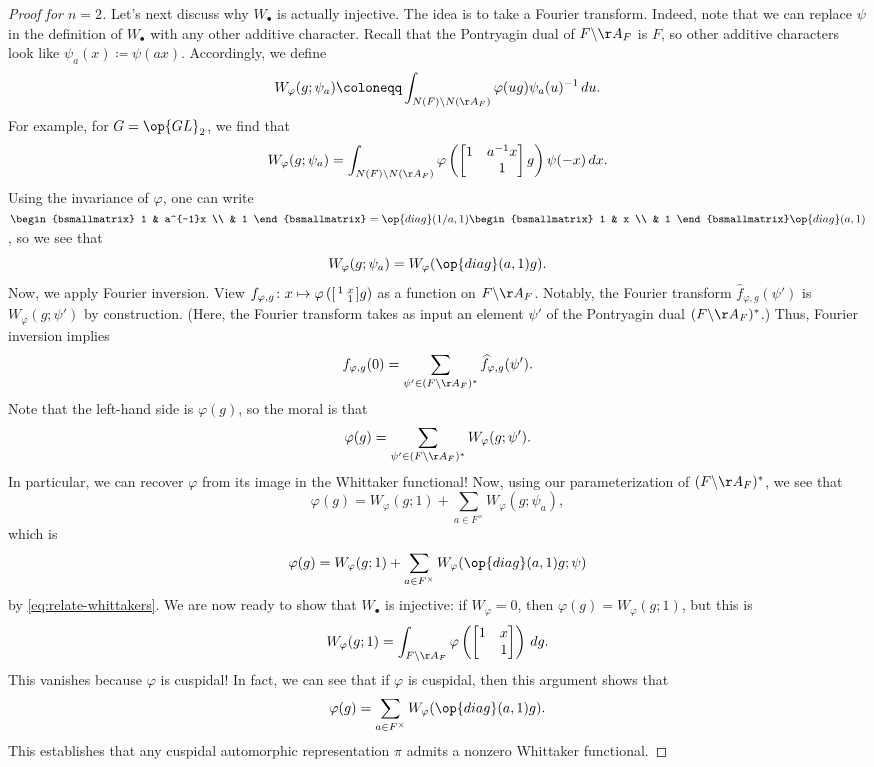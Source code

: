 \documentclass[../notes.tex]{subfiles}
\begin{document}
\begin{proof}[Proof for $n=2$]
	Let's next discuss why $W_\bullet$ is actually injective. The idea is to take a Fourier transform. Indeed, note that we can replace $\psi$ in the definition of $W_\bullet$ with any other additive character. Recall that the Pontryagin dual of $F\backslash\AA_F$ is $F$, so other additive characters look like $\psi_a(x)\coloneqq\psi(ax)$. Accordingly, we define
	\[W_\varphi(g;\psi_a)\coloneqq\int_{N(F)\backslash N(\AA_F)}\varphi(ug)\psi_a(u)^{-1}\,du.\]
	For example, for $G=\op{GL}_2$, we find that
	\[W_\varphi(g;\psi_a)=\int_{N(F)\backslash N(\AA_F)}\varphi\left(\begin{bmatrix}
		1 & a^{-1}x \\ & 1
	\end{bmatrix}g\right)\psi(-x)\,dx.\]
	Using the invariance of $\varphi$, one can write $\begin{bsmallmatrix}
		1 & a^{-1}x \\ & 1
	\end{bsmallmatrix}=\op{diag}(1/a,1)\begin{bsmallmatrix}
		1 & x \\ & 1
	\end{bsmallmatrix}\op{diag}(a,1)$, so we see that
	\begin{equation}
		W_\varphi(g;\psi_a)=W_\varphi(\op{diag}(a,1)g). \label{eq:relate-whittakers}
	\end{equation}
	Now, we apply Fourier inversion. View $f_{\varphi,g}\colon x\mapsto\varphi\left(\begin{bsmallmatrix}
		1 & x \\ & 1
	\end{bsmallmatrix}g\right)$ as a function on $F\backslash\AA_F$. Notably, the Fourier transform $\widehat f_{\varphi,g}(\psi')$ is $W_\varphi(g;\psi')$ by construction. (Here, the Fourier transform takes as input an element $\psi'$ of the Pontryagin dual $(F\backslash\AA_F)^*$.) Thus, Fourier inversion implies
	\[f_{\varphi,g}(0)=\sum_{\psi'\in(F\backslash\AA_F)^*}\widehat f_{\varphi,g}(\psi').\]
	Note that the left-hand side is $\varphi(g)$, so the moral is that
	\[\varphi(g)=\sum_{\psi'\in(F\backslash\AA_F)^*}W_\varphi(g;\psi').\]
	In particular, we can recover $\varphi$ from its image in the Whittaker functional! Now, using our parameterization of $(F\backslash\AA_F)^*$, we see that
	\[\varphi(g)=W_\varphi(g;1)+\sum_{a\in F^\times}W_\varphi(g;\psi_a),\]
	which is
	\[\varphi(g)=W_\varphi(g;1)+\sum_{a\in F^\times}W_\varphi(\op{diag}(a,1)g;\psi)\]
	by \eqref{eq:relate-whittakers}. We are now ready to show that $W_\bullet$ is injective: if $W_\varphi=0$, then $\varphi(g)=W_\varphi(g;1)$, but this is
	\[W_\varphi(g;1)=\int_{F\backslash\AA_F}\varphi\left(\begin{bmatrix}
		1 & x \\ & 1
	\end{bmatrix}\right)\,dg.\]
	This vanishes because $\varphi$ is cuspidal! In fact, we can see that if $\varphi$ is cuspidal, then this argument shows that
	\[\varphi(g)=\sum_{a\in F^\times}W_\varphi(\op{diag}(a,1)g).\]
	This establishes that any cuspidal automorphic representation $\pi$ admits a nonzero Whittaker functional.


\end{proof}
\end{document}
